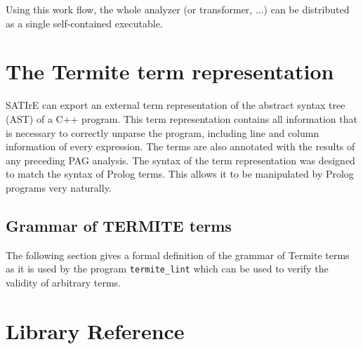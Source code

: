 \documentclass[10pt,twoside]{scrreprt}
\begin{document}
Using this work flow, the whole analyzer (or transformer, ...) can be
distributed as a single self-contained executable.

\chapter{The Termite  term representation}

SATIrE can export an external term representation of the abstract
syntax tree (AST) of a C++ program. This term representation contains
all information that is necessary to correctly unparse the program,
including line and column information of every expression. The terms
are also annotated with the results of any preceding PAG analysis. The
syntax of the term representation was designed to match the syntax of
Prolog terms. This allows it to be manipulated by Prolog programs very
naturally.

\section{Grammar of TERMITE terms}

The following section gives a formal definition of the grammar of
Termite terms as it is used by the program \verb|termite_lint|
which can be used to verify the validity of arbitrary terms.


\chapter{Library Reference}


\printindex
\end{document}
